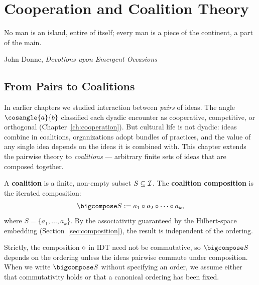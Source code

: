 

\chapter{Cooperation and Coalition Theory}
\label{ch:coalitions}

\epigraph{No man is an island, entire of itself; every man is a piece of the
continent, a part of the main.}{John Donne, \textit{Devotions upon Emergent
Occasions}}

\section{From Pairs to Coalitions}

In earlier chapters we studied interaction between \emph{pairs} of ideas.  The
angle $\cosangle{a}{b}$ classified each dyadic encounter as cooperative,
competitive, or orthogonal (Chapter~\ref{ch:cooperation}).  But cultural life
is not dyadic: ideas combine in coalitions, organizations adopt bundles of
practices, and the value of any single idea depends on the ideas it is combined
with.  This chapter extends the pairwise theory to \emph{coalitions} ---
arbitrary finite sets of ideas that are composed together.

\begin{definition}[Coalition]
\label{def:coalition}
A \textbf{coalition} is a finite, non-empty subset $S \subseteq \mathcal{I}$.  The
\textbf{coalition composition} is the iterated composition:
\[
  \bigcompose S := a_1 \compose a_2 \compose \cdots \compose a_k,
\]
where $S = \{a_1, \ldots, a_k\}$.  By the associativity guaranteed by the
Hilbert-space embedding (Section~\ref{sec:composition}), the result is
independent of the ordering.
\end{definition}

\begin{remark}
Strictly, the composition $\circ$ in IDT need not be commutative, so
$\bigcompose S$ depends on the ordering unless the ideas pairwise commute under
composition.  When we write $\bigcompose S$ without specifying an order, we
assume either that commutativity holds or that a canonical ordering has been
fixed.
\end{remark}

